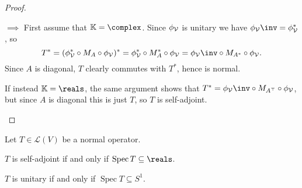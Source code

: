 \documentclass[article, a4paper, 11pt, oneside]{memoir}
\numberwithin{equation}{chapter}
\newcommand{\calL}{\mathcal{L}}
\newcommand{\calV}{\mathcal{V}}
\DeclareMathOperator{\spec}{Spec}
\newcommand{\trans}{^{\top}}
\begin{document}
\begin{proof}
\begin{proofsec}
    \item[\subcref{enum:spectral-multiplication-operator} $\implies$ \subcref{enum:spectral-selfadjoint-normal}]
    First assume that $\mathbb{K} = \complex$. Since $\coordmap{\calV}$ is unitary we have $\coordmap{\calV}\inv = \coordmap{\calV}^*$, so
    \begin{equation*}
        T^*
            = (\coordmap{\calV}^* \circ M_A \circ \coordmap{\calV})^*
            = \coordmap{\calV}^* \circ M_A^* \circ \coordmap{\calV}
            = \coordmap{\calV}\inv \circ M_{A^*} \circ \coordmap{\calV}.
    \end{equation*}
    Since $A$ is diagonal, $T$ clearly commutes with $T^*$, hence is normal.

    If instead $\mathbb{K} = \reals$, the same argument shows that $T^* = \coordmap{\calV}\inv \circ M_{A\trans} \circ \coordmap{\calV}$, but since $A$ is diagonal this is just $T$, so $T$ is self-adjoint.
\end{proofsec}
\end{proof}


\begin{corollary}
    \label{cor:self-adjoint-unitary-eigenvalue-characterisation}
    Let $T \in \calL(V)$ be a normal operator.
    \begin{enumcor}
        \item \label{enum:self-adjoint-eigenvalue-characterisation} $T$ is self-adjoint if and only if $\spec T \subseteq \reals$.
        \item \label{enum:unitary-eigenvalue-characterisation} $T$ is unitary if and only if $\spec T \subseteq S^1$.
    \end{enumcor}
\end{corollary}
\end{document}
